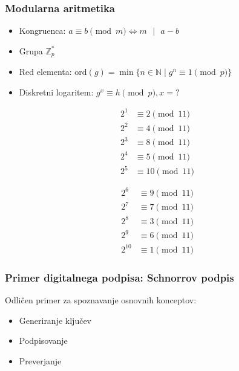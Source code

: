 \documentclass{beamer}    %
\begin{document}
\begin{frame}
    \frametitle{Modularna aritmetika}
    \begin{itemize}
        \item Kongruenca: $a \equiv b \pmod{m} \iff m \text{ }|\text{ }a - b$
        \item Grupa $\mathbb{Z}_p^*$
        \item Red elementa: $\text{ord}(g) = 
                \min\{n \in \mathbb{N} \mid g^n \equiv 1 \pmod{p}\}$
        \item Diskretni logaritem: $g^x \equiv h \pmod{p}, x = ?$
    \end{itemize}
    \begin{multicols*}{2}
        \begin{align*}
            2^1 &\equiv 2 \pmod{11} \\
            2^2 &\equiv 4 \pmod{11} \\
            2^3 &\equiv 8 \pmod{11} \\
            2^4 &\equiv 5 \pmod{11} \\
            2^5 &\equiv 10 \pmod{11} \\
        \end{align*}
        \columnbreak
        \begin{align*}
            \\
            2^6 &\equiv 9 \pmod{11} \\
            2^7 &\equiv 7 \pmod{11} \\
            2^8 &\equiv 3 \pmod{11} \\
            2^9 &\equiv 6 \pmod{11} \\
            2^{10} &\equiv 1 \pmod{11} 
        \end{align*}
    \end{multicols*}
\end{frame}

\begin{frame}
    \frametitle{Primer digitalnega podpisa: Schnorrov podpis}
    Odličen primer za spoznavanje osnovnih konceptov:
    \vspace{1cm}
    \begin{itemize}
        \item Generiranje ključev
        \item Podpisovanje
        \item Preverjanje 
    \end{itemize}
\end{frame}
\end{document}

